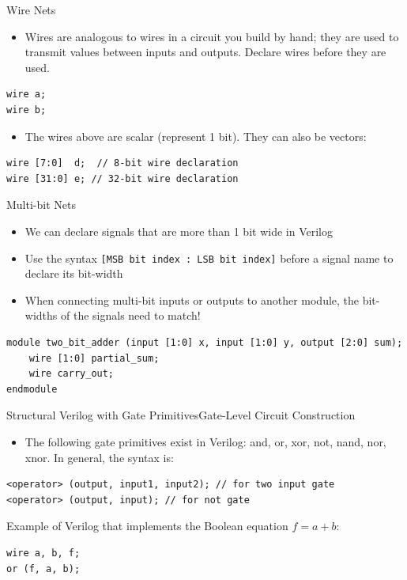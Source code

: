 \documentclass{beamer}
\begin{document}
\begin{frame}[fragile]{Wire Nets}
	\begin{itemize}
		\item Wires are analogous to wires in a circuit you build by hand; they are used to transmit values between inputs and outputs. Declare wires before they are used.
	\end{itemize}
\begin{verbatim}
wire a;
wire b;
\end{verbatim}

	\begin{itemize}
		\item The wires above are scalar (represent 1 bit). They can also be vectors:
	\end{itemize}
\begin{verbatim}
wire [7:0]  d;  // 8-bit wire declaration
wire [31:0] e; // 32-bit wire declaration
\end{verbatim}
\end{frame}

\begin{frame}[fragile]{Multi-bit Nets}
	\begin{itemize}
		\item We can declare signals that are more than 1 bit wide in Verilog
		\item Use the syntax \texttt{[MSB bit index : LSB bit index]} before a signal name to declare its bit-width
		\item When connecting multi-bit inputs or outputs to another module, the bit-widths of the signals need to match!
	\end{itemize}
\begin{verbatim}
module two_bit_adder (input [1:0] x, input [1:0] y, output [2:0] sum);
	wire [1:0] partial_sum;
	wire carry_out;
endmodule
\end{verbatim}
\end{frame}

\begin{frame}[fragile]{Structural Verilog with Gate Primitives}{Gate-Level Circuit Construction}
	\begin{itemize}
		\item The following gate primitives exist in Verilog: and, or, xor, not, nand, nor, xnor. In general, the syntax is:
	\end{itemize}
\begin{verbatim}
<operator> (output, input1, input2); // for two input gate
<operator> (output, input); // for not gate
\end{verbatim}

Example of Verilog that implements the Boolean equation $f = a + b$:

\begin{verbatim}
wire a, b, f;
or (f, a, b);
\end{verbatim}
\end{frame}
\end{document}
